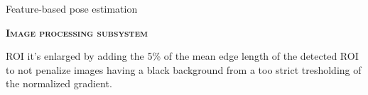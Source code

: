 \documentclass[10pt]{beamer}
\begin{document}
\begin{frame}{Feature-based pose estimation}

  \bigskip

  \textsc{\textbf{\large Image processing subsystem}}

  \bigskip

  ROI it's enlarged by adding the 5\% of the mean edge length of the detected ROI to not penalize images having a black background from a too strict tresholding of the normalized gradient.

  \smallskip

  \begin{figure}
    \captionsetup[subfigure]{labelformat=empty}
    \centering
    \qquad
    \qquad
  \end{figure}

  \bigskip
\end{frame}
\end{document}
